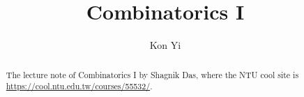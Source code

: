 \documentclass[a4paper]{report}
\author{Kon Yi}
\title{Combinatorics I}
\begin{document}
\maketitle

\begin{abstract}
The lecture note of Combinatorics I by Shagnik Das, where the NTU cool site is \url{https://cool.ntu.edu.tw/courses/55532/}.
\end{abstract}

\newpage

\tableofcontents


\newpage
\appendix
\appendixpage{}



\newpage
\pagestyle{plain}
\printbibliography{}
\end{document}
